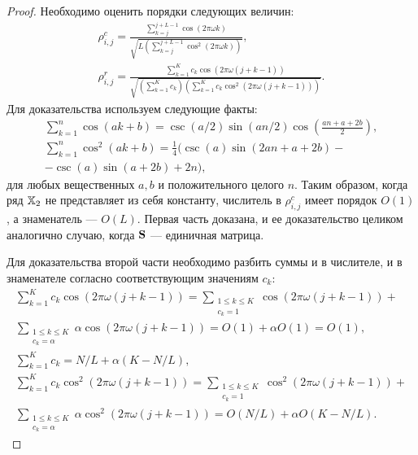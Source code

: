 \documentclass[12pt,a4paper,fleqn,leqno]{article}
\begin{document}
\begin{proof}
Необходимо оценить порядки следующих величин:
\begin{gather*}
\rho^c_{i,j} = \frac{\sum_{k=j}^{j + L - 1} \cos(2 \pi \omega k)}{\sqrt{L (\sum_{k=j}^{j + L - 1} \cos^2(2 \pi \omega k))}},\\ \rho^r_{i,j} = \frac{\sum_{k=1}^K c_k\cos(2 \pi \omega (j + k - 1))}{\sqrt{(\sum_{k=1}^K c_k) (\sum_{k=1}^K c_k\cos^2(2 \pi \omega (j + k - 1)))}}.
\end{gather*}
Для доказательства используем следующие факты:
\begin{gather*}
\sum_{k=1}^n \cos(ak + b) = \csc(a/2) \sin(an / 2) \cos \left(\frac{an + a + 2b}{2} \right), \\
\sum_{k=1}^n \cos^2(ak + b) = \frac{1}{4}(\csc(a) \sin(2an + a + 2b) -\\ - \csc(a)\sin(a + 2b) + 2n),
\end{gather*}
для любых вещественных $a, b$ и положительного целого $n$.
Таким образом, когда ряд $\mathbb{X}_2$ не представляет из себя константу, числитель в $\rho^c_{i,j}$ имеет порядок $O(1)$, а знаменатель --- $O(L)$. Первая часть доказана, и ее доказательство целиком аналогично случаю, когда $\mathbf{S}$ --- единичная матрица.

Для доказательства второй части необходимо разбить суммы и в числителе, и в знаменателе согласно соответствующим значениям $c_k$:
\begin{gather*}
\sum_{k=1}^K c_k\cos(2 \pi \omega (j + k - 1)) = \sum_{\substack{1 \le k \le K \\ c_k = 1}}\cos(2 \pi \omega (j + k - 1)) +\\ \sum_{\substack{1 \le k \le K \\ c_k = \alpha}}\alpha \cos(2 \pi \omega (j + k - 1)) = O(1) + \alpha O(1) = O(1),\\
\sum_{k=1}^K c_k = N/L + \alpha(K - N/L),\\
\sum_{k=1}^K c_k\cos^2(2 \pi \omega (j + k - 1)) = \sum_{\substack{1 \le k \le K \\ c_k = 1}}\cos^2(2 \pi \omega (j + k - 1)) +\\ \sum_{\substack{1 \le k \le K \\ c_k = \alpha}}\alpha \cos^2(2 \pi \omega (j + k - 1)) = O(N/L) + \alpha O(K - N/L).
\end{gather*}
\end{proof}

\end{document}
